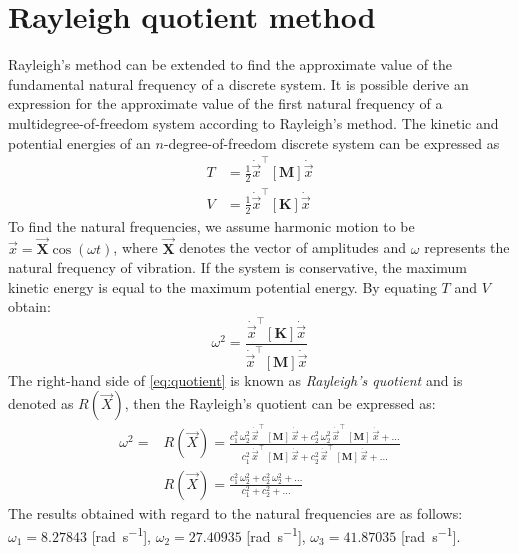 \section{Rayleigh quotient method}
\label{sec:ray}
Rayleigh's method can be extended to find the approximate value of the fundamental
natural frequency of a discrete system.
It is possible derive an expression for the approximate value of the first
natural frequency of a multidegree-of-freedom system according to Rayleigh's
method.
The kinetic and potential energies of an \(n\)-degree-of-freedom discrete system
can be expressed as
\begin{align}\label{eq:energyequation}
  T &= \frac{1}{2}\dot{\vec{x}}^{\top}[\mathbf{M}]\dot{\vec{x}}\\[1em]
  V &= \frac{1}{2}\dot{\vec{x}}^{\top}[\mathbf{K}]\dot{\vec{x}}
\end{align}
To find the natural frequencies, we assume harmonic motion to be
\(\vec{x} = \vec{\mathbf{X}} \cos(\omega t)\), where \(\vec{\mathbf{X}}\) 
denotes the vector of amplitudes and \(\omega\) represents the natural frequency
of vibration.
If the system is conservative, the maximum kinetic energy is equal to the
maximum potential energy. By equating \(T\) and \(V\) obtain:
\begin{equation}\label{eq:quotient}
  \omega^2 = \frac{\dot{\vec{x}}^{\top}[\mathbf{K}]\dot{\vec{x}}}
  {\dot{\vec{x}}^{\top}[\mathbf{M}]\dot{\vec{x}}}
\end{equation}
%
The right-hand side of \eqref{eq:quotient} is known as \emph{Rayleigh's quotient}
and is denoted as \(R(\vec{X})\), then the Rayleigh's quotient can be expressed
as:
\begin{align}
  \omega^{2} =& R(\vec{X}) =
  \frac{
          c_{1}^{2}\,\omega_{2}^{2}\,\dot{\vec{x}}^{\top}\,[\mathbf{M}]\,\dot{\vec{x}} +
          c_{2}^{2}\,\omega_{2}^{2}\,\dot{\vec{x}}^{\top}\,[\mathbf{M}]\,\dot{\vec{x}} +
          \dots}
       {
          c_{1}^{2}\,\dot{\vec{x}}^{\top}\,[\mathbf{M}]\,\dot{\vec{x}} +
          c_{2}^{2}\,\dot{\vec{x}}^{\top}\,[\mathbf{M}]\,\dot{\vec{x}} + \dots
        }\\[1.5em]
      &  R(\vec{X}) =
      \frac{c_{1}^{2}\,\omega_{2}^{2} + c_{2}^{2}\,\omega_{2}^{2} + \dots}
           {c_{1}^{2} + c_{2}^{2} + \dots}
\end{align}
The results obtained with regard to the natural frequencies are as follows:
\(\omega_{1} = 8.27843\) [\si{\radian\per\second}],
\(\omega_{2} = 27.40935\) [\si{\radian\per\second}],
\(\omega_{3} = 41.87035\) [\si{\radian\per\second}].
